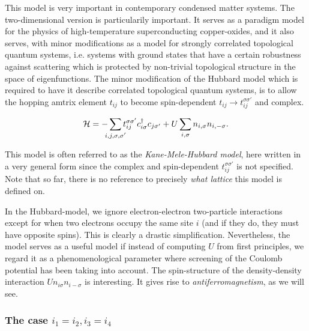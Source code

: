 This model is very important in contemporary condensed matter systems. 
The two-dimensional version is particularily important. It serves as a paradigm model for the physics of high-temperature superconducting copper-oxides, and it also serves, with minor modifications as a model for strongly correlated topological quantum systems, i.e. systems with ground states that have a certain robustness against scattering which is protected by non-trivial topological structure in the space of eigenfunctions. 
The minor modification of the Hubbard model which is required to have it describe correlated topological quantum systems, is to allow the hopping amtrix element $t_{ij}$ to become spin-dependent $t_{ij}\rightarrow t_{ij}^{\sigma\sigma'}$ and complex.
\begin{tcolorbox}
	\begin{equation}
		\Ha = -\sum_{\mathclap{i,j,\sigma,\sigma'}}t_{ij}^{\sigma\sigma'}\cd_{i\sigma}c_{j\sigma'} + U\sum_{i,\sigma}n_{i,\sigma}n_{i,-\sigma}.
	\end{equation}
\end{tcolorbox}
This model is often referred to as the \emph{Kane-Mele-Hubbard model}, here written in a very general form since the complex and spin-dependent $t_{ij}^{\sigma\sigma'}$ is not specified.
Note that so far, there is no reference to precisely \emph{what lattice} this model is defined on.

In the Hubbard-model, we ignore electron-electron two-particle interactions except for when two electrons occupy the same site $ i $ (and if they do, they must have opposite spins). This is clearly a drastic simplification. Nevertheless, the model serves as a useful model if instead of computing $U$ from first principles, we regard it as a phenomenological parameter where screening of the Coulomb potential has been taking into account.
The spin-structure of the density-density interaction $Un_{i\sigma}n_{i-\sigma}$ is interesting. It gives rise to \emph{antiferromagnetism}, as we will see.

\subsubsection*{The case $i_1=i_2, i_3 = i_4$}

